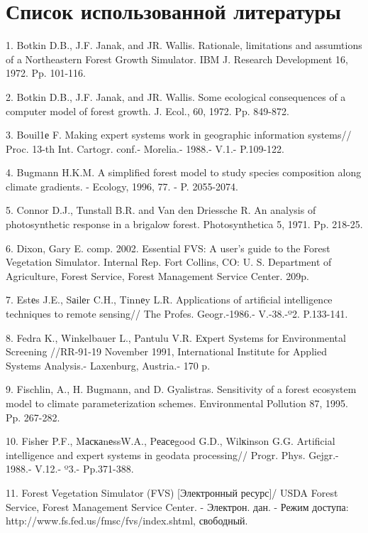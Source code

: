 \documentclass{article}
\begin{document}
\section*{\textbf{Список использованной литературы}}

1. Botkin D.B., J.F. Janak, and JR. Wallis. Rationale, limitations and assumtions 
of a Northeastern Forest Growth Simulator. IBM J. Research Development 16, 1972. 
Pp. 101-116.

2. Botkin D.B., J.F. Janak, and JR. Wallis. Some ecological consequences of a computer 
model of forest growth. J. Ecol., 60, 1972. Pp. 849-872.

3. Bouil1е F. Making expert systems work in geographic information systems// Proc. 
13-th Int. Cartogr. conf.- Morelia.- 1988.- V.1.- P.109-122.

4. Bugmann H.K.M. A simplified forest model to study species composition along 
climate gradients. - Ecology, 1996, 77. - P. 2055-2074.

5. Connor D.J., Tunstall B.R. and Van den Driessche R. An analysis of photosynthetic 
response in a brigalow forest. Photosynthetica 5, 1971. Pp. 218-25.

6. Dixon, Gary E. comp. 2002. Essential FVS: A user's guide to the Forest Vegetation 
Simulator. Internal Rep. Fort Collins, CO: U. S. Department of Agriculture, Forest 
Service, Forest Management Service Center. 209p.

7. Estеs J.E., Sаilеr C.H., Tinnеy L.R. Applications of artificial intelligence 
techniques to remote sensing// The Profes. Geogr.-1986.- V.-38.-º2. P.133-141.

8. Fedra K., Winkelbauer L., Pantulu V.R. Eхpert Systems for Environmental Screening 
//RR-91-19 November 1991, International Institute for Applied Systems Analysis.- 
Laxenburg, Austria.- 170 p.

9. Fischlin, A., H. Bugmann, and D. Gyalistras. Sensitivity of a forest ecosystem 
model to climate parameterization schemes. Environmental Pollution 87, 1995. Pp. 
267-282.

10. Fishеr P.F., MаскаnеssW.A., Pеасеgood G.D., Wilкinson G.G. Artificial 
intelligence and expert systems in geodata processing// Progr. Phys. Gejgr.- 1988.- 
V.12.- º3.- Pp.371-388.

11. Forest Vegetation Simulator (FVS) [Электронный ресурс]/ USDA 
Forest Service, Forest Management Service Center. - Электрон. дан. - 
Режим доступа: http://www.fs.fed.us/fmsc/fvs/index.shtml, свободный.
\end{document}
